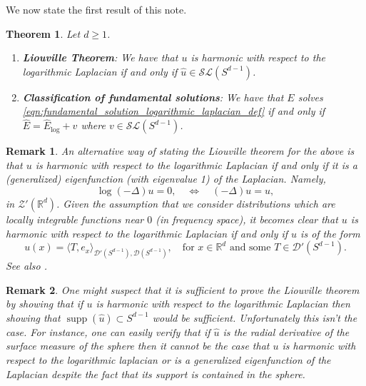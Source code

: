 \documentclass[11pt]{amsart}
\DeclareMathOperator{\supp}{supp}
\newcommand{\R}{\mathbb{R}}
\newtheorem{theorem}{Theorem}
\newtheorem{remark}{Remark}
\begin{document}
We now state the first result of this note. 

\begin{theorem}\label{thm:classification_logarithmic_laplacian}
	Let $d\geq 1$.  
	\begin{enumerate}
		\item \textbf{Liouville Theorem}:
			We have that $u$ is harmonic with respect to the logarithmic Laplacian if and only if $\hat{u}\in \mathcal{SL}(S^{d-1})$. 
		\item \textbf{Classification of fundamental solutions}:
		We have that $E$ solves \eqref{eqn:fundamental_solution_logarithmic_laplacian_def} if and only if $\hat{E}=\hat{E}_{\log}+v$ where $v\in \mathcal{SL}(S^{d-1})$. 
	\end{enumerate}
\end{theorem}

\begin{remark}
	An alternative way of stating the Liouville theorem for the above is that $u$ is harmonic with respect to the logarithmic Laplacian if and only if it is a (generalized) eigenfunction (with eigenvalue 1) of the Laplacian. Namely, 
	\begin{equation*}
		\log(-\Delta)u=0, \quad \iff \quad (-\Delta)u=u,
	\end{equation*}
	in $\mathcal{Z}'(\R^d)$. Given the assumption that we consider distributions which are locally integrable functions near $0$ (in frequency space), it becomes clear that $u$ is harmonic with respect to the logarithmic Laplacian if and only if $u$ is of the form 
	\begin{equation*}
	u(x)=\langle T,e_{x}\rangle_{\mathcal{D}'(S^{d-1}),\mathcal{D}(S^{d-1})},\quad \text{for $x\in \R^d$ and some $T\in \mathcal{D}'(S^{d-1})$.}
	\end{equation*}
  See also \cite[Theorem 4.1]{MR1730501}. 
\end{remark}

\begin{remark}
One might suspect that it is sufficient to prove the Liouville theorem by showing that if $u$ is harmonic with respect to the logarithmic Laplacian then showing that $\supp(\hat{u})\subset S^{d-1}$ would be sufficient. Unfortunately this isn't the case. For instance, one can easily verify that if $\hat{u}$ is the radial derivative of the surface measure of the sphere then it cannot be the case that $u$ is harmonic with respect to the logarithmic laplacian or is a generalized eigenfunction of the Laplacian despite the fact that its support is contained in the sphere. 
\end{remark}
\end{document}
